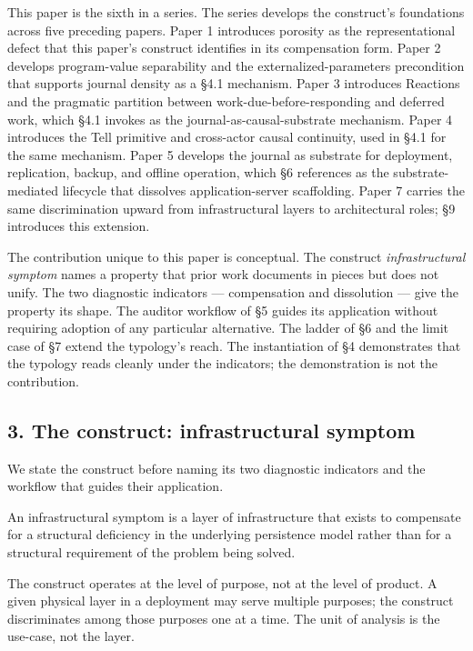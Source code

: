 \documentclass[
]{article}
\begin{document}
This paper is the sixth in a series. The series develops the construct's
foundations across five preceding papers. Paper 1 introduces porosity as
the representational defect that this paper's construct identifies in
its compensation form. Paper 2 develops program-value separability and
the externalized-parameters precondition that supports journal density
as a §4.1 mechanism. Paper 3 introduces Reactions and the pragmatic
partition between work-due-before-responding and deferred work, which
§4.1 invokes as the journal-as-causal-substrate mechanism. Paper 4
introduces the Tell primitive and cross-actor causal continuity, used in
§4.1 for the same mechanism. Paper 5 develops the journal as substrate
for deployment, replication, backup, and offline operation, which §6
references as the substrate-mediated lifecycle that dissolves
application-server scaffolding. Paper 7 carries the same discrimination
upward from infrastructural layers to architectural roles; §9 introduces
this extension.

The contribution unique to this paper is conceptual. The construct
\emph{infrastructural symptom} names a property that prior work
documents in pieces but does not unify. The two diagnostic indicators
--- compensation and dissolution --- give the property its shape. The
auditor workflow of §5 guides its application without requiring adoption
of any particular alternative. The ladder of §6 and the limit case of §7
extend the typology's reach. The instantiation of §4 demonstrates that
the typology reads cleanly under the indicators; the demonstration is
not the contribution.

\subsection{3. The construct: infrastructural
symptom}\label{the-construct-infrastructural-symptom}

We state the construct before naming its two diagnostic indicators and
the workflow that guides their application.

An infrastructural symptom is a layer of infrastructure that exists to
compensate for a structural deficiency in the underlying persistence
model rather than for a structural requirement of the problem being
solved.

The construct operates at the level of purpose, not at the level of
product. A given physical layer in a deployment may serve multiple
purposes; the construct discriminates among those purposes one at a
time. The unit of analysis is the use-case, not the layer.
\end{document}
